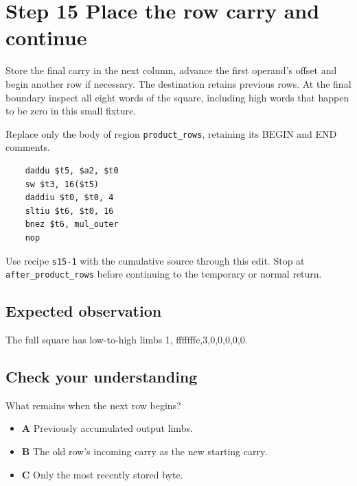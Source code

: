 \section{Step 15 Place the row carry and continue}\label{rsa-s15}

Store the final carry in the next column, advance the first operand's offset and begin another row if necessary. The destination retains previous rows. At the final boundary inspect all eight words of the square, including high words that happen to be zero in this small fixture.

Replace only the body of region \texttt{product\_rows}, retaining its BEGIN and END comments.

\begin{verbatim}
    daddu $t5, $a2, $t0
    sw $t3, 16($t5)
    daddiu $t0, $t0, 4
    sltiu $t6, $t0, 16
    bnez $t6, mul_outer
    nop
\end{verbatim}

Use recipe \texttt{s15-1} with the cumulative source through this edit. Stop at \texttt{after\_product\_rows} before continuing to the temporary or normal return.

\subsection{Expected observation}
The full square has low-to-high limbs 1, fffffffc,3,0,0,0,0,0.

\subsection{Check your understanding}
What remains when the next row begins?

\begin{itemize}
  \item \textbf{A} Previously accumulated output limbs.
  \item \textbf{B} The old row's incoming carry as the new starting carry.
  \item \textbf{C} Only the most recently stored byte.
\end{itemize}
